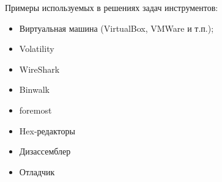 Примеры используемых в решениях задач инструментов:
\begin{itemize}
    \item Виртуальная машина (VirtualBox, VMWare и т.п.);
    \item Volatility
    \item WireShark
    \item Binwalk
    \item foremost
    \item Hex-редакторы
    \item Дизассемблер
    \item Отладчик
\end{itemize}

